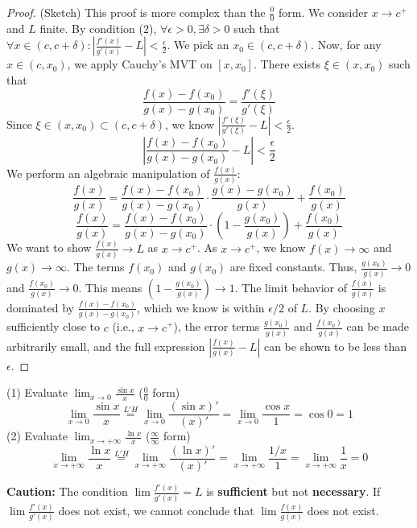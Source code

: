 \begin{proof}
(Sketch) This proof is more complex than the $\frac{0}{0}$ form. We consider $x \to c^+$ and $L$ finite.
By condition (2), $\forall \epsilon > 0, \exists \delta > 0$ such that $\forall x \in (c, c+\delta): |\frac{f'(x)}{g'(x)} - L| < \frac{\epsilon}{2}$.
We pick an $x_0 \in (c, c+\delta)$.
Now, for any $x \in (c, x_0)$, we apply Cauchy's MVT on $[x, x_0]$. There exists $\xi \in (x, x_0)$ such that
\[
\frac{f(x) - f(x_0)}{g(x) - g(x_0)} = \frac{f'(\xi)}{g'(\xi)}
\]
Since $\xi \in (x, x_0) \subset (c, c+\delta)$, we know $|\frac{f'(\xi)}{g'(\xi)} - L| < \frac{\epsilon}{2}$.
\[
\left| \frac{f(x) - f(x_0)}{g(x) - g(x_0)} - L \right| < \frac{\epsilon}{2}
\]
We perform an algebraic manipulation of $\frac{f(x)}{g(x)}$:
\[
\frac{f(x)}{g(x)} = \frac{f(x) - f(x_0)}{g(x) - g(x_0)} \cdot \frac{g(x) - g(x_0)}{g(x)} + \frac{f(x_0)}{g(x)}
\]
\[
\frac{f(x)}{g(x)} = \frac{f(x) - f(x_0)}{g(x) - g(x_0)} \cdot \left(1 - \frac{g(x_0)}{g(x)}\right) + \frac{f(x_0)}{g(x)}
\]
We want to show $\frac{f(x)}{g(x)} \to L$ as $x \to c^+$.
As $x \to c^+$, we know $f(x) \to \infty$ and $g(x) \to \infty$. The terms $f(x_0)$ and $g(x_0)$ are fixed constants.
Thus, $\frac{g(x_0)}{g(x)} \to 0$ and $\frac{f(x_0)}{g(x)} \to 0$.
This means $\left(1 - \frac{g(x_0)}{g(x)}\right) \to 1$.
The limit behavior of $\frac{f(x)}{g(x)}$ is dominated by $\frac{f(x) - f(x_0)}{g(x) - g(x_0)}$, which we know is within $\epsilon/2$ of $L$.
By choosing $x$ sufficiently close to $c$ (i.e., $x \to c^+$), the error terms $\frac{g(x_0)}{g(x)}$ and $\frac{f(x_0)}{g(x)}$ can be made arbitrarily small, and the full expression $\left| \frac{f(x)}{g(x)} - L \right|$ can be shown to be less than $\epsilon$.
\end{proof}

\begin{example}
(1) Evaluate $\lim_{x \to 0} \frac{\sin x}{x}$ ($\frac{0}{0}$ form)
\[
\lim_{x \to 0} \frac{\sin x}{x} \overset{L'H}{=} \lim_{x \to 0} \frac{(\sin x)'}{(x)'} = \lim_{x \to 0} \frac{\cos x}{1} = \cos 0 = 1
\]
(2) Evaluate $\lim_{x \to +\infty} \frac{\ln x}{x}$ ($\frac{\infty}{\infty}$ form)
\[
\lim_{x \to +\infty} \frac{\ln x}{x} \overset{L'H}{=} \lim_{x \to +\infty} \frac{(\ln x)'}{(x)'} = \lim_{x \to +\infty} \frac{1/x}{1} = \lim_{x \to +\infty} \frac{1}{x} = 0
\]
\end{example}

\begin{remark}
\textbf{Caution:} The condition $\lim \frac{f'(x)}{g'(x)} = L$ is \textbf{sufficient} but not \textbf{necessary}. If $\lim \frac{f'(x)}{g'(x)}$ does not exist, we cannot conclude that $\lim \frac{f(x)}{g(x)}$ does not exist.
\end{remark}



